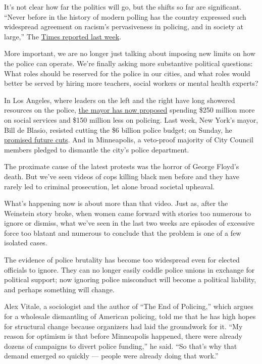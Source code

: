 It's not clear how far the politics will go, but the shifts so far are
significant. ``Never before in the history of modern polling has the
country expressed such widespread agreement on racism's pervasiveness in
policing, and in society at large,'' The
\href{https://www.nytimes.com/2020/06/05/us/politics/polling-george-floyd-protests-racism.html}{Times
reported last week}.

More important, we are no longer just talking about imposing new limits
on how the police can operate. We're finally asking more substantive
political questions: What roles should be reserved for the police in our
cities, and what roles would better be served by hiring more teachers,
social workers or mental health experts?

In Los Angeles, where leaders on the left and the right have long
showered resources on the police,
\href{https://www.latimes.com/california/story/2020-06-05/eric-garcetti-lapd-budget-cuts-10000-officers-protests}{the
mayor has now proposed} spending \$250 million more on social services
and \$150 million less on policing. Last week, New York's mayor, Bill de
Blasio, resisted cutting the \$6 billion police budget; on Sunday, he
\href{https://www.nytimes.com/2020/06/07/nyregion/deblasio-nypd-funding.html}{promised
future cuts}. And in Minneapolis, a veto-proof majority of City Council
members pledged to dismantle the city's police department.

The proximate cause of the latest protests was the horror of George
Floyd's death. But we've seen videos of cops killing black men before
and they have rarely led to criminal prosecution, let alone broad
societal upheaval.

What's happening now is about more than that video. Just as, after the
Weinstein story broke, when women came forward with stories too numerous
to ignore or dismiss, what we've seen in the last two weeks are episodes
of excessive force too blatant and numerous to conclude that the problem
is one of a few isolated cases.

The evidence of police brutality has become too widespread even for
elected officials to ignore. They can no longer easily coddle police
unions in exchange for political support; now ignoring police misconduct
will become a political liability, and perhaps something will change.

Alex Vitale, a sociologist and the author of ``The End of Policing,''
which argues for a wholesale dismantling of American policing, told me
that he has high hopes for structural change because organizers had laid
the groundwork for it. ``My reason for optimism is that before
Minneapolis happened, there were already dozens of campaigns to divert
police funding,'' he said. ``So that's why that demand emerged so
quickly --- people were already doing that work.''

